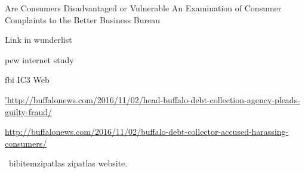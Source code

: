 \documentclass[conference]{IEEEtran}
\begin{document}
\begin{thebibliography}{1}
Are Consumers Disadvantaged or Vulnerable An Examination of Consumer Complaints to the Better Business Bureau

Link in wunderlist

pew internet study

fbi IC3 Web

\url{'http://buffalonews.com/2016/11/02/head-buffalo-debt-collection-agency-pleads-guilty-fraud/}

\url{http://buffalonews.com/2016/11/02/buffalo-debt-collector-accused-harassing-consumers/}

\ bibitem{zipatlas}
zipatlas website.

\end{thebibliography}




\end{document}
